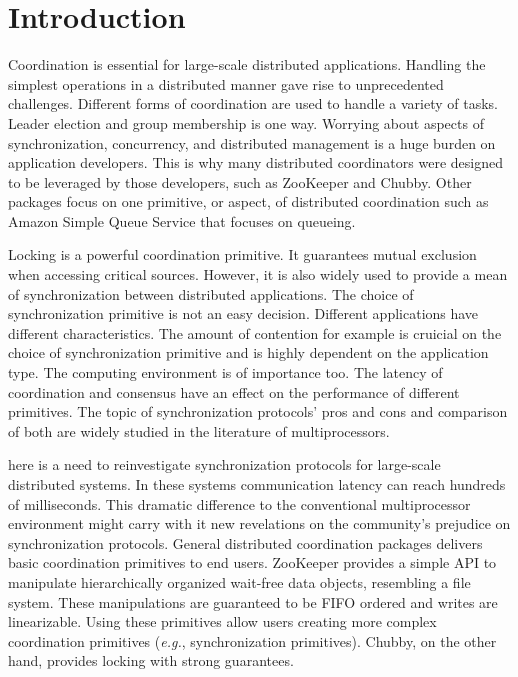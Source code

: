 \section{Introduction}\label{sec:intro}

Coordination is essential for large-scale distributed applications. Handling the simplest operations in a distributed manner gave rise to unprecedented challenges. Different forms of coordination are used to handle a variety of tasks. Leader election and group membership is one way. Worrying about aspects of synchronization, concurrency, and distributed management is a huge burden on application developers. This is why many distributed coordinators were designed to be leveraged by those developers, such as ZooKeeper and Chubby. Other packages focus on one primitive, or aspect, of distributed coordination such as Amazon Simple Queue Service that focuses on queueing.

Locking is a powerful coordination primitive. It guarantees mutual exclusion when accessing critical sources. However, it is also widely used to provide a mean of synchronization between distributed applications. The choice of synchronization primitive is not an easy decision. Different applications have different characteristics. The amount of contention for example is cruicial on the choice of synchronization primitive and is highly dependent on the application type. The computing environment is of importance too. The latency of coordination and consensus have an effect on the performance of different primitives. The topic of synchronization protocols' pros and cons and comparison of both are widely studied in the literature of multiprocessors.

here is a need to reinvestigate synchronization protocols for large-scale distributed systems. In these systems communication latency can reach hundreds of milliseconds. This dramatic difference to the conventional multiprocessor environment might carry with it new revelations on the community's prejudice on synchronization protocols. General distributed coordination packages delivers basic coordination primitives to end users. ZooKeeper provides a simple API to manipulate hierarchically organized wait-free data objects, resembling a file system. These manipulations are guaranteed to be FIFO ordered and writes are linearizable. Using these primitives allow users creating more complex coordination primitives (\emph{e.g.}, synchronization primitives). Chubby, on the other hand, provides locking with strong guarantees.

